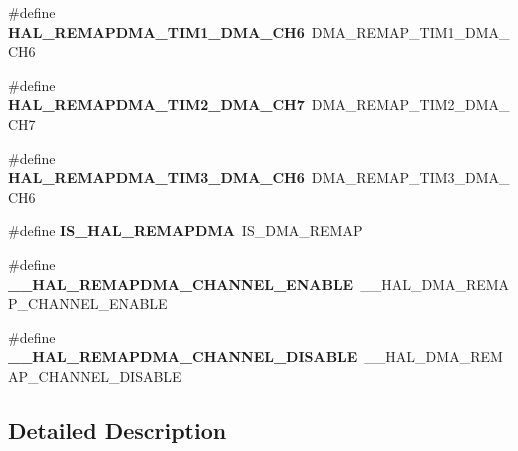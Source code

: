 \begin{DoxyCompactItemize}
\item 
\mbox{\label{group___h_a_l___d_m_a___aliased___defines_ga60ba973bcc155520e8b58deb73948d80}} 
\#define {\bfseries H\+A\+L\+\_\+\+R\+E\+M\+A\+P\+D\+M\+A\+\_\+\+T\+I\+M1\+\_\+\+D\+M\+A\+\_\+\+C\+H6}~D\+M\+A\+\_\+\+R\+E\+M\+A\+P\+\_\+\+T\+I\+M1\+\_\+\+D\+M\+A\+\_\+\+C\+H6
\item 
\mbox{\label{group___h_a_l___d_m_a___aliased___defines_gac2e00fc0ee4dd4d3ffdbdae32d211a35}} 
\#define {\bfseries H\+A\+L\+\_\+\+R\+E\+M\+A\+P\+D\+M\+A\+\_\+\+T\+I\+M2\+\_\+\+D\+M\+A\+\_\+\+C\+H7}~D\+M\+A\+\_\+\+R\+E\+M\+A\+P\+\_\+\+T\+I\+M2\+\_\+\+D\+M\+A\+\_\+\+C\+H7
\item 
\mbox{\label{group___h_a_l___d_m_a___aliased___defines_ga1159405ec3b5377790d12238aa48007e}} 
\#define {\bfseries H\+A\+L\+\_\+\+R\+E\+M\+A\+P\+D\+M\+A\+\_\+\+T\+I\+M3\+\_\+\+D\+M\+A\+\_\+\+C\+H6}~D\+M\+A\+\_\+\+R\+E\+M\+A\+P\+\_\+\+T\+I\+M3\+\_\+\+D\+M\+A\+\_\+\+C\+H6
\item 
\mbox{\label{group___h_a_l___d_m_a___aliased___defines_gac6b3f25c675802ffa4bcabdd78a878b9}} 
\#define {\bfseries I\+S\+\_\+\+H\+A\+L\+\_\+\+R\+E\+M\+A\+P\+D\+MA}~I\+S\+\_\+\+D\+M\+A\+\_\+\+R\+E\+M\+AP
\item 
\mbox{\label{group___h_a_l___d_m_a___aliased___defines_gabe3d38b912b94fa014e2bdf898804671}} 
\#define {\bfseries \+\_\+\+\_\+\+H\+A\+L\+\_\+\+R\+E\+M\+A\+P\+D\+M\+A\+\_\+\+C\+H\+A\+N\+N\+E\+L\+\_\+\+E\+N\+A\+B\+LE}~\+\_\+\+\_\+\+H\+A\+L\+\_\+\+D\+M\+A\+\_\+\+R\+E\+M\+A\+P\+\_\+\+C\+H\+A\+N\+N\+E\+L\+\_\+\+E\+N\+A\+B\+LE
\item 
\mbox{\label{group___h_a_l___d_m_a___aliased___defines_ga6bdaf74acc4e075354d1d31bf5f69f06}} 
\#define {\bfseries \+\_\+\+\_\+\+H\+A\+L\+\_\+\+R\+E\+M\+A\+P\+D\+M\+A\+\_\+\+C\+H\+A\+N\+N\+E\+L\+\_\+\+D\+I\+S\+A\+B\+LE}~\+\_\+\+\_\+\+H\+A\+L\+\_\+\+D\+M\+A\+\_\+\+R\+E\+M\+A\+P\+\_\+\+C\+H\+A\+N\+N\+E\+L\+\_\+\+D\+I\+S\+A\+B\+LE
\end{DoxyCompactItemize}


\subsection{Detailed Description}
